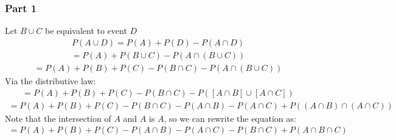 \documentclass{article}
\begin{document}
\subsubsection*{Part 1}
Let $B \cup C$ be equivalent to event $D$
\begin{align*}
P(A\cup D) = P(A) + P(D) - P(A\cap D)
\end{align*}
\begin{align*}
 = P(A) + P(B \cup C) - P(A\cap (B \cup C))
\end{align*}
\begin{align*}
 = P(A) + P(B) + P(C) - P(B\cap C) - P(A\cap (B \cup C))
\end{align*}
Via the distributive law:
\begin{align*}
 = P(A) + P(B) + P(C) - P(B\cap C) - P([A\cap B]\cup [A\cap C])
\end{align*}
\begin{align*}
 = P(A) + P(B) + P(C) - P(B\cap C) - P(A\cap B) - P(A\cap C) + P((A\cap B) \cap (A\cap C))
\end{align*}
Note that the intersection of $A$ and $A$ is $A$, so we can rewrite the equation as:
\begin{align*}
\boxed{= P(A) + P(B) + P(C) - P(A\cap B) - P(A\cap C) - P(B\cap C) + P(A\cap B\cap C)}
\end{align*}
\end{document}
